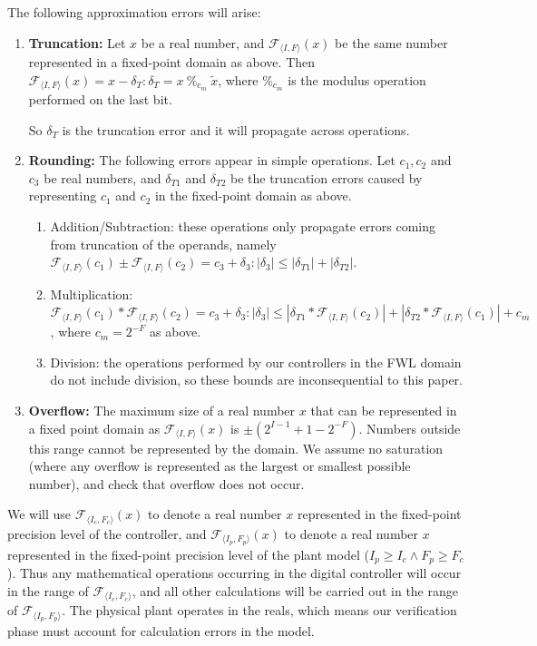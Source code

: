 \documentclass[runningheads,a4paper]{llncs}
\begin{document}
The following approximation errors will arise:
\begin{enumerate}
\item {\bf Truncation:}
Let $x$ be a real number, and $\mathcal{F}_{\langle I,F \rangle}(x)$ be the same number represented in a fixed-point domain as above. 
Then $\mathcal{F}_{\langle I,F \rangle}(x) = x-\delta_T : \delta_T=x\ \%_{c_m}\ \tilde x$, where $\%_{c_m}$ is the modulus operation performed on the last bit.

So $\delta_T$ is the truncation error and it will propagate across operations.
\item {\bf Rounding:}
The following errors appear in simple operations. Let $c_1, c_2$ and $c_3$ be real numbers, and $\delta_{T1}$ and $\delta_{T2}$ be the truncation errors caused by representing $c_1$ and $c_2$ in the fixed-point domain as above.
\begin{enumerate}
\item Addition/Subtraction: these operations only propagate errors coming from truncation of the operands, namely 
$\mathcal{F}_{\langle I,F \rangle}(c_1) \pm \mathcal{F}_{\langle I,F \rangle}(c_2) = c_3 + \delta_3 :|\delta_3| \leq |\delta_{T1}| + |\delta_{T2}|$.
\item Multiplication: $\mathcal{F}_{\langle I,F \rangle}(c_1) * \mathcal{F}_{\langle I,F \rangle}(c_2) =  c_3 + \delta_3 :|\delta_3| \leq |\delta_{T1}*\mathcal{F}_{\langle I,F \rangle}(c_2)| + |\delta_{T2}*\mathcal{F}_{\langle I,F \rangle}(c_1)| + c_m$, where $c_m=2^{-F}$ as above.
\item Division: the operations performed by our controllers in the FWL domain do not include division, so these bounds are inconsequential to this paper. 
\end{enumerate}

\item {\bf Overflow:}
The maximum size of a real number $x$ that can be represented in a fixed point domain as $\mathcal{F}_{\langle I,F \rangle}(x)$ is $\pm (2^{I-1}+1-2^{-F})$. Numbers outside this range cannot be represented by the domain. We assume no saturation (where any overflow is represented as the largest or smallest possible number), and check that overflow does not occur.

\end{enumerate}

We will use $\mathcal{F}_{\langle I_c,F_c \rangle}(x)$ to denote a real number $x$ represented in the fixed-point precision level of the controller, and $\mathcal{F}_{\langle I_p,F_p \rangle}(x)$ to denote a real number $x$ represented in the fixed-point precision level of the plant model ($I_p \geq I_c \wedge F_p \geq F_c$).
Thus any mathematical operations occurring in the digital controller will occur in the range of $\mathcal{F}_{\langle I_c,F_c \rangle}$, and all other calculations will be carried out in the range of $\mathcal{F}_{\langle I_p,F_p \rangle}$. The physical plant operates in the reals, which means our verification phase must account for calculation errors in the model.
\end{document}
